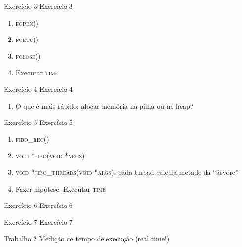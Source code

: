 \documentclass{beamer}
\begin{document}
\begin{frame}[fragile]{Exercício 3}
  \centering
  \Large
  Exercício 3
  \begin{enumerate}
    \item <2-> \textsc{fopen()}
    \item <3-> \textsc{fgetc()}
    \item <4-> \textsc{fclose()}
    \item <5-> Executar \textsc{time}
  \end{enumerate}
\end{frame}

\begin{frame}[fragile]{Exercício 4}
  \centering
  \Large
  Exercício 4
  \begin{enumerate}
    \item <2-> O que é mais rápido: alocar memória na pilha ou no heap?
  \end{enumerate}
\end{frame}

\begin{frame}[fragile]{Exercício 5}
  \centering
  \Large
  Exercício 5
  \begin{enumerate}
    \item <2-> \textsc{fibo\_rec()}
    \item <3-> \textsc{void *fibo(void *args)}
    \item <4-> \textsc{void *fibo\_threads(void *args)}: cada thread calcula
      metade da ``árvore''
    \item <5-> Fazer hipótese. Executar \textsc{time}
  \end{enumerate}
\end{frame}

\begin{frame}[fragile]{Exercício 6}
  \centering
  \Large
  Exercício 6
\end{frame}

\begin{frame}[fragile]{Exercício 7}
  \centering
  \Large
  Exercício 7
\end{frame}


\begin{frame}[fragile]{Trabalho 2}
  \centering
  \LARGE
  Medição de tempo de execução (real time!)
\end{frame}
\end{document}
